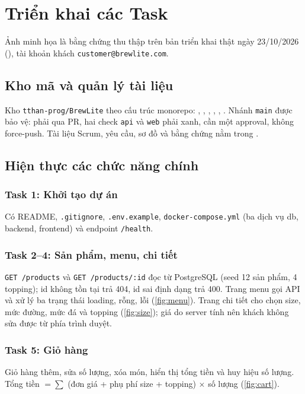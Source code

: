 \chapter{Triển khai các Task}\label{ch:trienkhai-se}
Ảnh minh họa là bằng chứng thu thập trên bản triển khai thật ngày 23/10/2026 (), tài khoản khách \texttt{customer@brewlite.com}.

\section{Kho mã và quản lý tài liệu}\label{sec:se-repo}
Kho \texttt{tthan-prog/BrewLite} theo cấu trúc monorepo: , , , , , . Nhánh \texttt{main} được bảo vệ: phải qua PR, hai check \texttt{api} và \texttt{web} phải xanh, cần một approval, không force-push. Tài liệu Scrum, yêu cầu, sơ đồ và bằng chứng nằm trong .

\section{Hiện thực các chức năng chính}\label{sec:se-hienthuc}
\subsection{Task 1: Khởi tạo dự án}
Có README, \texttt{.gitignore}, \texttt{.env.example}, \texttt{docker-compose.yml} (ba dịch vụ db, backend, frontend) và endpoint \texttt{/health}.

\subsection{Task 2--4: Sản phẩm, menu, chi tiết}
\texttt{GET /products} và \texttt{GET /products/:id} đọc từ PostgreSQL (seed 12 sản phẩm, 4 topping); id không tồn tại trả 404, id sai định dạng trả 400. Trang menu gọi API và xử lý ba trạng thái loading, rỗng, lỗi (\cref{fig:menu}). Trang chi tiết cho chọn size, mức đường, mức đá và topping (\cref{fig:size}); giá do server tính nên khách không sửa được từ phía trình duyệt.

\subsection{Task 5: Giỏ hàng}
Giỏ hàng thêm, sửa số lượng, xóa món, hiển thị tổng tiền và huy hiệu số lượng. Tổng tiền $=\sum$ (đơn giá + phụ phí size + topping) $\times$ số lượng (\cref{fig:cart}).

